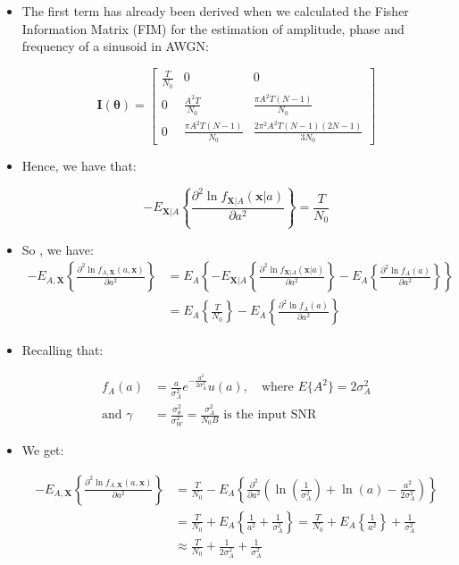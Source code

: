 \begin{itemize}
\item The first term has already been derived when we calculated the Fisher Information Matrix (FIM) for the estimation of amplitude, phase and frequency of a sinusoid in AWGN:

$$
\mathbf{I}(\boldsymbol{\theta})= \left[\begin{matrix}
\frac{T}{N_{0}} & 0 & 0 \\
0 & \frac{A^{2}T}{N_{0}} & \frac{\pi A^{2}T(N-1)}{N_{0}} \\
0 & \frac{\pi A^{2}T(N-1)}{N_{0}} & \frac{2\pi^{2} A^{2}T(N-1)(2N-1)}{3N_{0}}
\end{matrix}\right]
$$
\item Hence, we have that: 

$$
-E_{\mathbf{X}|A}\left\{\frac{\partial^2 \ln f_{\mathbf{X}|A}(\mathbf{x}|a)}{\partial a^2}\right\} = \frac{T}{N_{0}}
$$

\item So , we have:
\begin{align*}
-E_{A,\mathbf{X}}\left\{\frac{\partial^2 \ln f_{A,\mathbf{X}}(a,\mathbf{x})}{\partial a^2}\right\} &= E_{A}\left\{-E_{\mathbf{X}|A}\left\{\frac{\partial^2 \ln f_{\mathbf{X}|A}(\mathbf{x}|a)}{\partial a^2}\right\} - E_{A}\left\{\frac{\partial^2 \ln f_{A}(a)}{\partial a^2}\right\}\right\} \\
&= E_{A}\left\{\frac{T}{N_{0}}\right\} - E_{A}\left\{\frac{\partial^2 \ln f_{A}(a)}{\partial a^2}\right\}
\end{align*}
\item Recalling that:

\begin{align*}
f_{A}(a) &= \frac{a}{\sigma_{A}^{2}}e^{-\frac{a^{2}}{2\sigma_{A}^{2}}}u(a), \quad \text{where } E\{A^{2}\} = 2\sigma_{A}^{2} \\
\text{and } \gamma &= \frac{\sigma_{\theta}^{2}}{\sigma_{W}^{2}} = \frac{\sigma_{A}^{2}}{N_{0}B} \text{ is the input SNR}
\end{align*}

\item We get:

\begin{align*}
-E_{A,\mathbf{X}}\left\{\frac{\partial^2 \ln f_{A,\mathbf{X}}(a,\mathbf{x})}{\partial a^2}\right\} &= \frac{T}{N_{0}} - E_{A}\left\{\frac{\partial^2}{\partial a^2}\left(\ln\left(\frac{1}{\sigma_{A}^{2}}\right) + \ln(a) - \frac{a^{2}}{2\sigma_{A}^{2}}\right)\right\} \\[5pt]
&= \frac{T}{N_{0}} + E_{A}\left\{\frac{1}{a^{2}} + \frac{1}{\sigma_{A}^{2}}\right\}= \frac{T}{N_{0}} + E_{A}\left\{\frac{1}{a^{2}}\right\} + \frac{1}{\sigma_{A}^{2}} \\[5pt]
&\approx \frac{T}{N_{0}} + \frac{1}{2\sigma_{A}^{2}} + \frac{1}{\sigma_{A}^{2}}
\end{align*}


\end{itemize}
